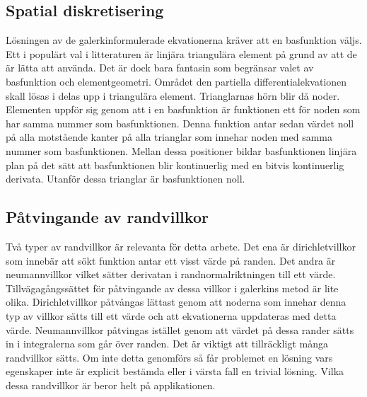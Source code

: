 \subsection{Spatial diskretisering}

Lösningen av de galerkinformulerade ekvationerna kräver att en basfunktion väljs.
Ett i populärt val i litteraturen är linjära triangulära element på grund av att de
är lätta att använda. Det är dock bara fantasin som begränsar valet av basfunktion
och elementgeometri.
\cite{johnson2009}\cite{lewis04}\cite{reddy93}\cite{fem50} Området den
partiella differentialekvationen skall lösas i delas upp i triangulära element.
Trianglarnas hörn blir då noder. Elementen uppför sig genom att i en basfunktion
är funktionen ett för noden som har samma nummer som basfunktionen. Denna funktion
antar sedan värdet noll på alla motstående kanter på alla trianglar som innehar noden
med samma nummer som basfunktionen. Mellan dessa positioner bildar basfunktionen
linjära plan på det sätt att basfunktionen blir kontinuerlig med en bitvis
kontinuerlig derivata.
Utanför dessa trianglar är basfunktionen noll. \cite{johnson2009}

\subsection{Påtvingande av randvillkor}
\label{subsec:boundaryenforcement}
Två typer av randvillkor är relevanta för detta arbete. Det ena är dirichletvillkor som
innebär att sökt funktion antar ett visst värde på randen. Det andra är neumannvillkor
vilket sätter derivatan i randnormalriktningen till ett värde. Tillvägagångssättet
för påtvingande av dessa villkor i galerkins metod är lite olika. Dirichletvillkor
påtvångas lättast genom att noderna som innehar denna typ av villkor sätts till ett värde
och att ekvationerna uppdateras med detta värde. Neumannvillkor påtvingas istället
genom att värdet på dessa rander sätts in i integralerna som går över randen. Det
är viktigt att tillräckligt många randvillkor sätts. Om inte detta genomförs
så får problemet en lösning vars egenskaper inte är explicit bestämda eller
i värsta fall en trivial lösning. Vilka dessa randvillkor är beror helt
på applikationen.
